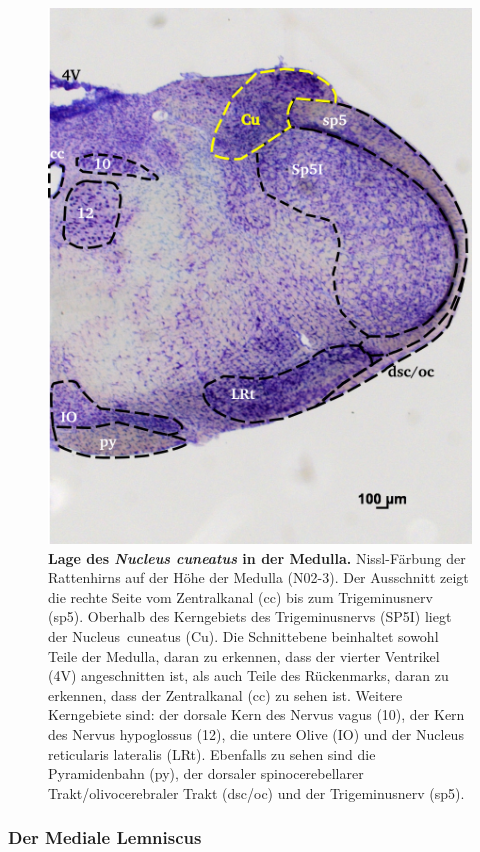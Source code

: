\documentclass[12pt,a4paper,pdftex]{article}
\begin{document}
\begin{figure}[H]
    \centering
    \includegraphics{pictures/somatosensory/nucleus_cuneatus.png}
    \caption[Lage des Nucleus cuneatus in der Medulla]{\textbf{Lage des \textit{Nucleus cuneatus} in der Medulla.} Nissl-Färbung der Rattenhirns auf der Höhe der Medulla (N02-3). Der Ausschnitt zeigt die rechte Seite vom Zentralkanal (cc) bis zum Trigeminusnerv (sp5). Oberhalb des Kerngebiets des Trigeminusnervs (SP5I) liegt der Nucleus~cuneatus (Cu). Die Schnittebene beinhaltet sowohl Teile der Medulla, daran zu erkennen, dass der vierter Ventrikel (4V) angeschnitten ist, als auch Teile des Rückenmarks, daran zu erkennen, dass der Zentralkanal (cc) zu sehen ist. Weitere Kerngebiete sind: der dorsale Kern des Nervus vagus (10), der Kern des Nervus hypoglossus (12), die untere Olive (IO) und der Nucleus reticularis lateralis (LRt). Ebenfalls zu sehen sind die Pyramidenbahn (py), der dorsaler spinocerebellarer Trakt/olivocerebraler Trakt (dsc/oc) und der Trigeminusnerv (sp5).}
    \label{fig:nucleus_cuneatus}
\end{figure}

\subsubsection*{Der Mediale Lemniscus}
\end{document}
